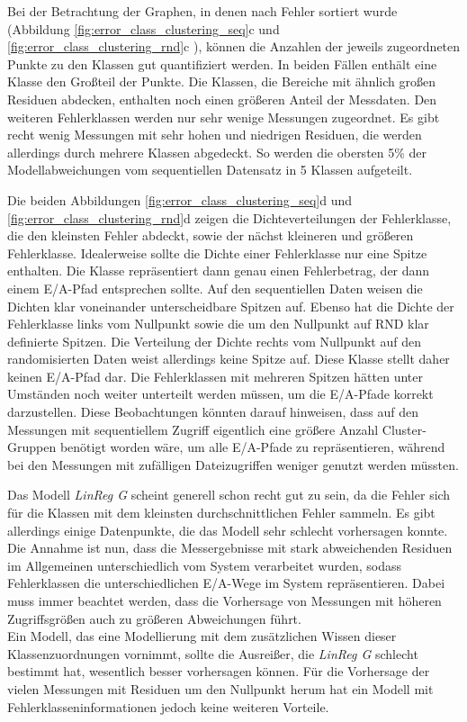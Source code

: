 \documentclass[
	twoside,
	12pt,
	a4paper,
	BCOR10mm,
	DIV14,
	listof=totoc,
	bibliography=totoc,
	headsepline
]{scrreprt}
\begin{document}
Bei der Betrachtung der Graphen, in denen nach Fehler sortiert wurde (Abbildung \ref{fig:error_class_clustering_seq}c und \ref{fig:error_class_clustering_rnd}c ), können die Anzahlen der jeweils zugeordneten Punkte zu den Klassen gut quantifiziert werden.
In beiden Fällen enthält eine Klasse den Großteil der Punkte.
Die Klassen, die Bereiche mit ähnlich großen Residuen abdecken, enthalten noch einen größeren Anteil der Messdaten. Den weiteren Fehlerklassen werden nur sehr wenige Messungen zugeordnet.
Es gibt recht wenig Messungen mit sehr hohen und niedrigen Residuen, die werden allerdings durch mehrere Klassen abgedeckt. So werden die obersten 5\% der Modellabweichungen vom sequentiellen Datensatz in 5 Klassen aufgeteilt.\medskip

Die beiden Abbildungen \ref{fig:error_class_clustering_seq}d und \ref{fig:error_class_clustering_rnd}d zeigen die Dichteverteilungen der Fehlerklasse, die den kleinsten Fehler abdeckt, sowie der nächst kleineren und größeren Fehlerklasse.
Idealerweise sollte die Dichte einer Fehlerklasse nur eine Spitze enthalten. Die Klasse repräsentiert dann genau einen Fehlerbetrag, der dann einem E/A-Pfad entsprechen sollte.
Auf den sequentiellen Daten weisen die Dichten klar voneinander unterscheidbare Spitzen auf.
Ebenso hat die Dichte der Fehlerklasse links vom Nullpunkt sowie die um den Nullpunkt auf RND klar definierte Spitzen. Die Verteilung der Dichte rechts vom Nullpunkt auf den randomisierten Daten weist allerdings keine Spitze auf. Diese Klasse stellt daher keinen E/A-Pfad dar.
Die Fehlerklassen mit mehreren Spitzen hätten unter Umständen noch weiter unterteilt werden müssen, um die E/A-Pfade korrekt darzustellen.
Diese Beobachtungen könnten darauf hinweisen, dass auf den Messungen mit sequentiellem Zugriff eigentlich eine größere Anzahl Cluster-Gruppen benötigt worden wäre, um alle E/A-Pfade zu repräsentieren, während bei den Messungen mit zufälligen Dateizugriffen weniger genutzt werden müssten. \medskip

Das Modell \textit{LinReg G} scheint generell schon recht gut zu sein, da die Fehler sich für die Klassen mit dem kleinsten durchschnittlichen Fehler sammeln.
Es gibt allerdings einige Datenpunkte, die das Modell sehr schlecht vorhersagen konnte. Die Annahme ist nun, dass die Messergebnisse mit stark abweichenden Residuen im Allgemeinen unterschiedlich vom System verarbeitet wurden, sodass Fehlerklassen die unterschiedlichen E/A-Wege im System repräsentieren. 
Dabei muss immer beachtet werden, dass die Vorhersage von Messungen mit höheren Zugriffsgrößen auch zu größeren Abweichungen führt.\\
Ein Modell, das eine Modellierung mit dem zusätzlichen Wissen dieser Klassenzuordnungen vornimmt, sollte die Ausreißer, die \textit{LinReg G} schlecht bestimmt hat, wesentlich besser vorhersagen können.
Für die Vorhersage der vielen Messungen mit Residuen um den Nullpunkt herum hat ein Modell mit Fehlerklasseninformationen jedoch keine weiteren Vorteile. 
\end{document}
